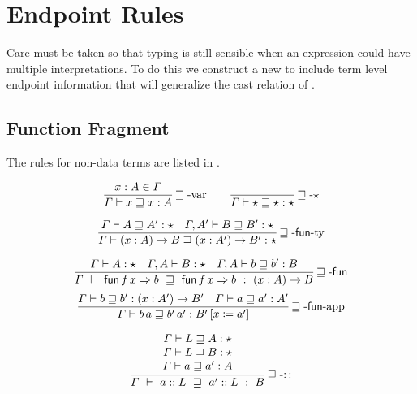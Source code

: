 \section{Endpoint Rules}

Care must be taken so that typing is still sensible when an expression could have multiple interpretations.
To do this we construct a new \csys{} to include term level endpoint information that will generalize the cast relation of \ch{3]}.

\subsection{Function Fragment}
The rules for non-data terms are listed in .

\begin{figure}

\begin{align*}
 \frac{x:A\in\varGamma}{\varGamma\vdash x\sqsupseteq x:A}\rulename{\sqsupseteq-var}
  \quad & \quad 
  \frac{\ }{\varGamma\vdash\star\sqsupseteq\star:\star}\rulename{\sqsupseteq-\star}
  \\
\end{align*}

\[
\frac{
\varGamma\vdash A\sqsupseteq A':\star \quad
\varGamma,A'\vdash B\sqsupseteq B':\star
}{
  \varGamma\vdash\left(x:A\right)\rightarrow B\sqsupseteq\left(x:A'\right)\rightarrow B':\star
}\operatorname{\sqsupseteq-\mathsf{fun}-ty}
\]

\[
\frac{
\varGamma\vdash A:\star\quad\varGamma,A\vdash B:\star \quad
\varGamma,A\vdash b\sqsupseteq b':B
}{
  \varGamma\ \vdash\ \mathsf{fun}\,f\,x\Rightarrow b\ \sqsupseteq\ \mathsf{fun}\,f\,x\Rightarrow b\ :\ \left(x:A\right)\rightarrow B
}\rulename{\sqsupseteq-\mathsf{fun}}
\]
\[
\frac{
\varGamma\vdash b\sqsupseteq b':\left(x:A'\right)\rightarrow B' \quad
\varGamma\vdash a\sqsupseteq a':A'
}{
  \varGamma\vdash b\,a\sqsupseteq b'\,a':B'\left[x\coloneqq a'\right]
}\operatorname{\sqsupseteq-\mathsf{fun}-app}
\]

\[
\frac{\begin{array}{c}
  \varGamma\vdash L\sqsupseteq A:\star\\
  \varGamma\vdash L\sqsupseteq B:\star\\
  \varGamma\vdash a\sqsupseteq a':A
  \end{array}}{\varGamma\ \vdash\ a::L\ \sqsupseteq\ a'::L\ :\ B}\rulename{\sqsupseteq-::}
\]


\end{figure}
